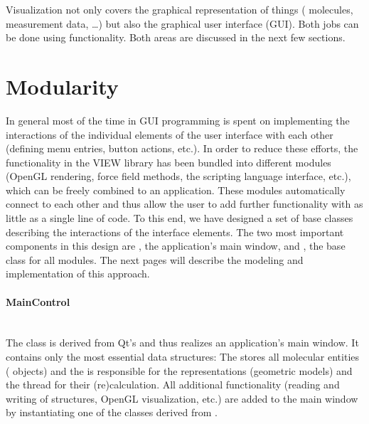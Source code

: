 \noindent
Visualization not only covers the graphical representation of things (\eg
molecules, measurement data, \dots) but also the graphical user interface
(GUI). Both jobs can be done using  functionality. Both areas are
discussed in the next few sections.


\section{Modularity}

In general most of the time in GUI programming is spent on implementing the 
interactions of the individual elements of the user interface with each other 
(\eg defining menu entries, button actions, etc.). In order to reduce these 
efforts, the functionality in the VIEW library has been bundled into different
modules (\eg OpenGL rendering, force field methods, the scripting language 
interface, etc.), which can be freely combined to an application. These modules
automatically connect to each other and thus allow the user to add further 
functionality with as little as a single line of code. To this end, we have 
designed a set of  base classes describing the interactions of the interface 
elements. The two most important components in this design are 
, the application's main window, and 
, the base class for all modules.
The next pages will describe the modeling and implementation of this approach.
\label{modularity}

\paragraph{MainControl} 
\hspace*{\fill}\\
The class  is derived from Qt's  and thus
realizes an application's main window. It contains only the most essential data
structures: The  stores all molecular entities
( objects) and the  is responsible for
the representations (\ie geometric models) and the thread for their
(re)calculation. All additional functionality (\eg reading and writing of 
structures, OpenGL visualization, etc.) are added to the main window by 
instantiating one of the classes derived from . 

